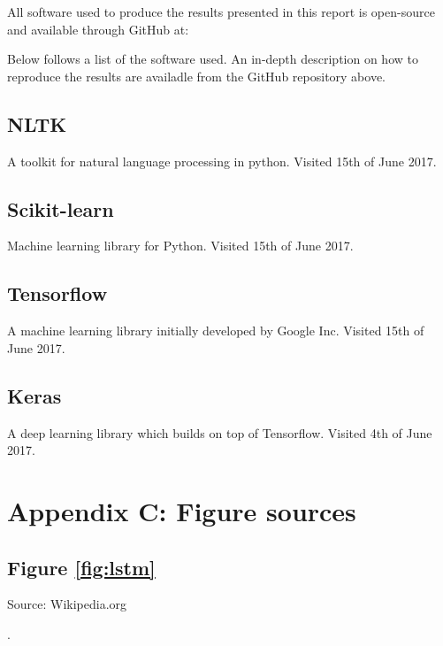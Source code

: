 \documentclass[a4paper]{article}
\begin{document}
All software used to produce the results presented in this report is open-source
and available through GitHub at:


Below follows a list of the software used. An in-depth description on how
to reproduce the results are availadle from the GitHub repository above.

\subsection{NLTK}
A toolkit for natural language processing in python. Visited 15th of June 2017.


\subsection{Scikit-learn}
Machine learning library for Python. Visited 15th of June 2017.


\subsection{Tensorflow}
A machine learning library initially developed by Google Inc.
Visited 15th of June 2017.


\subsection{Keras}
A deep learning library which builds on top of Tensorflow.
Visited 4th of June 2017.


\pagebreak
\section{Appendix C: Figure sources}
\subsection{Figure \ref{fig:lstm}}
Source: Wikipedia.org

.
\end{document}

